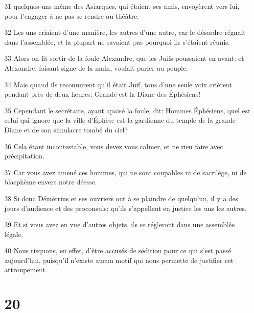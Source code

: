 \par 31 quelques-uns même des Asiarques, qui étaient ses amis, envoyèrent vers lui, pour l'engager à ne pas se rendre au théâtre.
\par 32 Les uns criaient d'une manière, les autres d'une autre, car le désordre régnait dans l'assemblée, et la plupart ne savaient pas pourquoi ils s'étaient réunis.
\par 33 Alors on fit sortir de la foule Alexandre, que les Juifs poussaient en avant; et Alexandre, faisant signe de la main, voulait parler au peuple.
\par 34 Mais quand ils reconnurent qu'il était Juif, tous d'une seule voix crièrent pendant près de deux heures: Grande est la Diane des Éphésiens!
\par 35 Cependant le secrétaire, ayant apaisé la foule, dit: Hommes Éphésiens, quel est celui qui ignore que la ville d'Éphèse est la gardienne du temple de la grande Diane et de son simulacre tombé du ciel?
\par 36 Cela étant incontestable, vous devez vous calmer, et ne rien faire avec précipitation.
\par 37 Car vous avez amené ces hommes, qui ne sont coupables ni de sacrilège, ni de blasphème envers notre déesse.
\par 38 Si donc Démétrius et ses ouvriers ont à se plaindre de quelqu'un, il y a des jours d'audience et des proconsuls; qu'ils s'appellent en justice les uns les autres.
\par 39 Et si vous avez en vue d'autres objets, ils se régleront dans une assemblée légale.
\par 40 Nous risquons, en effet, d'être accusés de sédition pour ce qui s'est passé aujourd'hui, puisqu'il n'existe aucun motif qui nous permette de justifier cet attroupement.

\chapter{20}

